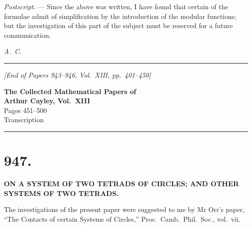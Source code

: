 \documentclass[11pt,a4paper]{book}
\begin{document}
{{{\medskip

\noindent\textit{Postscript.} --- Since the above was written, I have found that certain of the formulae admit of simplification by the introduction of the modular functions; but the investigation of this part of the subject must be reserved for a future communication.

\vspace{1cm}
\begin{flushright}
\textit{A.~C.}
\end{flushright}

\vfill
\begin{center}
\rule{0.5\textwidth}{0.4pt}

\smallskip
\textit{[End of Papers 943--946, Vol.~XIII, pp.~401--450]}
\end{center}
\clearpage


\begin{center}
{\Large\bfseries The Collected Mathematical Papers of\\[0.5em] Arthur Cayley, Vol.~XIII}\\[1em]
{\large Pages 451--500}\\[0.5em]
{\normalsize Transcription}
\end{center}

\hrule
\vspace{1em}


\section*{947.}

\begin{center}
{\large\bfseries ON A SYSTEM OF TWO TETRADS OF CIRCLES; AND OTHER SYSTEMS OF TWO TETRADS.}
\end{center}

\begin{flushright}
\end{flushright}

The investigations of the present paper were suggested to me by Mr Orr's paper, ``The Contacts of certain Systems of Circles,'' Proc.~Camb.~Phil.~Soc., vol.~vii.

}}}
\end{document}
